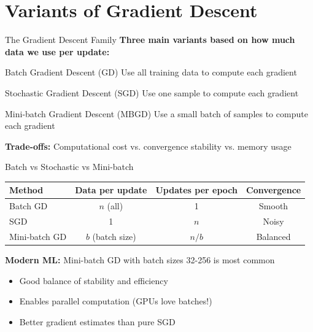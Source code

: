 \documentclass[usenames,dvipsnames]{beamer}
\begin{document}
  \section{Variants of Gradient Descent}

  \begin{frame}{The Gradient Descent Family}
    \textbf{Three main variants based on how much data we use per update:}
    
    \begin{definitionbox}{Batch Gradient Descent (GD)}
    Use all training data to compute each gradient
    \end{definitionbox}
    
    \begin{definitionbox}{Stochastic Gradient Descent (SGD)}
    Use one sample to compute each gradient
    \end{definitionbox}
    
    \begin{definitionbox}{Mini-batch Gradient Descent (MBGD)}
    Use a small batch of samples to compute each gradient
    \end{definitionbox}
    
    \pause
    \textbf{Trade-offs:} Computational cost vs. convergence stability vs. memory usage
  \end{frame}

  \begin{frame}{Batch vs Stochastic vs Mini-batch}
    \begin{center}
    \begin{tabular}{|l|c|c|c|}
        \hline
        \textbf{Method} & \textbf{Data per update} & \textbf{Updates per epoch} & \textbf{Convergence} \\
        \hline
        Batch GD & $n$ (all) & 1 & Smooth \\
        \hline
        SGD & 1 & $n$ & Noisy \\
        \hline
        Mini-batch GD & $b$ (batch size) & $n/b$ & Balanced \\
        \hline
    \end{tabular}
    \end{center}
    
    \pause
    \begin{keypointsbox}
    \textbf{Modern ML:} Mini-batch GD with batch sizes 32-256 is most common
    \begin{itemize}
        \item Good balance of stability and efficiency
        \item Enables parallel computation (GPUs love batches!)
        \item Better gradient estimates than pure SGD
    \end{itemize}
    \end{keypointsbox}
  \end{frame}
\end{document}
